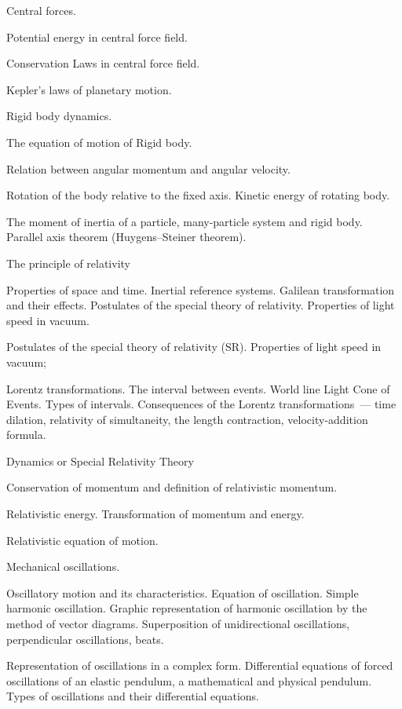 \documentclass{rnp}
\begin{document}
\begin{Rozdil}
	\begin{Rozdil}
	\item Central forces.
	\item Potential energy in central force field.
	\item Conservation Laws in central force field.
	\item Kepler's laws of planetary motion.
	\end{Rozdil}
\item Rigid body dynamics.
	\begin{Rozdil}
	\item The equation of motion of Rigid body.
	\item Relation between angular momentum and angular velocity.
	\item Rotation of the body relative to the fixed axis. Kinetic energy of rotating body.
	\item The moment of inertia of a particle, many-particle system and rigid body. Parallel axis theorem (Huygens–Steiner theorem).
	\end{Rozdil}
\item The principle of relativity
	\begin{Rozdil}
	\item Properties of space and time. Inertial reference systems. Galilean transformation and their effects. Postulates of the special theory of relativity. Properties of light speed in vacuum.
	\item Postulates of the special theory of relativity (SR). Properties of light speed in vacuum;
	\item  Lorentz transformations. The interval between events. World line Light Cone of Events. Types of intervals. Consequences of the Lorentz transformations~--- time dilation, relativity of simultaneity, the length contraction, velocity-addition formula.
	\end{Rozdil}
\item Dynamics or Special Relativity Theory
	\begin{Rozdil}
	\item Conservation of momentum and definition of relativistic momentum.
	\item Relativistic energy. 	Transformation of momentum and energy.
	\item Relativistic equation of motion.
	\end{Rozdil}
\item Mechanical oscillations.
	\begin{Rozdil}
	\item Oscillatory motion and its characteristics.
	Equation of oscillation. Simple harmonic oscillation. Graphic representation of harmonic oscillation by the method of vector diagrams.  Superposition of unidirectional oscillations, perpendicular oscillations, beats.
	\item 	Representation of oscillations in a complex form. Differential equations of forced oscillations of an elastic pendulum, a mathematical and physical pendulum. Types of oscillations and their differential equations.
	\end{Rozdil}
\end{Rozdil}
\end{document}
